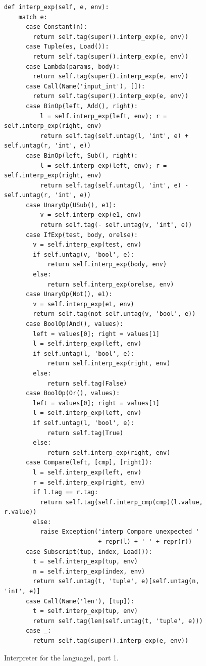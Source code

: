 \documentclass[7x10]{TimesAPriori_MIT}%
\def\pythonEd{1}
\def\edition{0}
\newcommand{\python}[1]{{\if\edition\pythonEd #1\fi}}
\numberwithin{theorem}{chapter}
\numberwithin{definition}{chapter}
\numberwithin{equation}{chapter}
\begin{document}
\begin{figure}[tbp]
\begin{tcolorbox}[colback=white]
{\begin{lstlisting}[basicstyle=\ttfamily\footnotesize]
  def interp_exp(self, e, env):
    match e:
      case Constant(n):
        return self.tag(super().interp_exp(e, env))
      case Tuple(es, Load()):
        return self.tag(super().interp_exp(e, env))
      case Lambda(params, body):
        return self.tag(super().interp_exp(e, env))
      case Call(Name('input_int'), []):
        return self.tag(super().interp_exp(e, env))
      case BinOp(left, Add(), right):
          l = self.interp_exp(left, env); r = self.interp_exp(right, env)
          return self.tag(self.untag(l, 'int', e) + self.untag(r, 'int', e))
      case BinOp(left, Sub(), right):
          l = self.interp_exp(left, env); r = self.interp_exp(right, env)
          return self.tag(self.untag(l, 'int', e) - self.untag(r, 'int', e))
      case UnaryOp(USub(), e1):
          v = self.interp_exp(e1, env)
          return self.tag(- self.untag(v, 'int', e))
      case IfExp(test, body, orelse):
        v = self.interp_exp(test, env)
        if self.untag(v, 'bool', e):
            return self.interp_exp(body, env)
        else:
            return self.interp_exp(orelse, env)
      case UnaryOp(Not(), e1):
        v = self.interp_exp(e1, env)
        return self.tag(not self.untag(v, 'bool', e))
      case BoolOp(And(), values):
        left = values[0]; right = values[1]
        l = self.interp_exp(left, env)
        if self.untag(l, 'bool', e):
            return self.interp_exp(right, env)
        else:
            return self.tag(False)
      case BoolOp(Or(), values):
        left = values[0]; right = values[1]
        l = self.interp_exp(left, env)
        if self.untag(l, 'bool', e):
            return self.tag(True)
        else:
            return self.interp_exp(right, env)
      case Compare(left, [cmp], [right]):
        l = self.interp_exp(left, env)
        r = self.interp_exp(right, env)
        if l.tag == r.tag:
          return self.tag(self.interp_cmp(cmp)(l.value, r.value))
        else:
          raise Exception('interp Compare unexpected '
                          + repr(l) + ' ' + repr(r))
      case Subscript(tup, index, Load()):
        t = self.interp_exp(tup, env)
        n = self.interp_exp(index, env)
        return self.untag(t, 'tuple', e)[self.untag(n, 'int', e)]
      case Call(Name('len'), [tup]):
        t = self.interp_exp(tup, env)
        return self.tag(len(self.untag(t, 'tuple', e)))
      case _:
        return self.tag(super().interp_exp(e, env))
\end{lstlisting}
\fi}
  \end{tcolorbox}

  \caption{Interpreter for the \LangDyn{} language\python{, part 1}.}
\label{fig:interp-Ldyn}
\end{figure}
\end{document}
